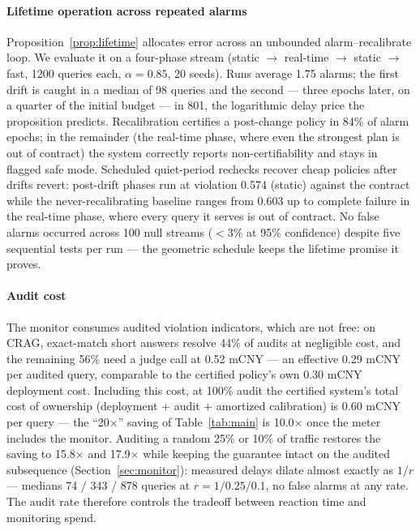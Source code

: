 \paragraph{Lifetime operation across repeated alarms}
Proposition~\ref{prop:lifetime} allocates error across an unbounded
alarm--recalibrate loop. We evaluate it on a four-phase
stream (static $\to$ real-time $\to$ static $\to$ fast, 1200 queries
each, $\alpha = 0.85$, 20 seeds). Runs average 1.75 alarms; the first
drift is caught in a median of 98 queries and the second --- three
epochs later, on a quarter of the initial budget --- in 801, the
logarithmic delay price the proposition predicts. Recalibration
certifies a post-change policy in 84\% of alarm epochs; in the
remainder (the real-time phase, where even the strongest plan is out
of contract) the system correctly reports non-certifiability and
stays in flagged safe mode. Scheduled quiet-period rechecks recover
cheap policies after drifts revert: post-drift phases run at
violation 0.574 (static) against the contract while the
never-recalibrating baseline ranges from 0.603 up to complete failure
in the real-time phase, where every query it serves is out of
contract. No false alarms occurred
across 100 null streams ($<3\%$ at 95\% confidence) despite five
sequential tests per run --- the
geometric schedule keeps the lifetime promise it proves.

\paragraph{Audit cost}
The monitor consumes audited violation indicators, which are not free:
on CRAG, exact-match short answers resolve 44\% of audits at
negligible cost, and the remaining 56\% need a judge call at 0.52 mCNY
--- an effective 0.29 mCNY per audited query, comparable to the
certified policy's own 0.30 mCNY deployment cost. Including this cost,
at 100\% audit the certified system's total cost of
ownership (deployment + audit + amortized calibration) is 0.60 mCNY
per query --- the ``20$\times$'' saving of Table~\ref{tab:main} is
10.0$\times$ once the meter includes the monitor. Auditing a random
25\% or 10\% of traffic restores the saving to 15.8$\times$ and
17.9$\times$ while keeping the guarantee intact on the audited
subsequence (Section~\ref{sec:monitor}): measured delays dilate almost
exactly as $1/r$ --- medians 74 / 343 / 878 queries at
$r = 1 / 0.25 / 0.1$, no false alarms at any rate. The audit rate
therefore controls the tradeoff between reaction time and monitoring
spend.

